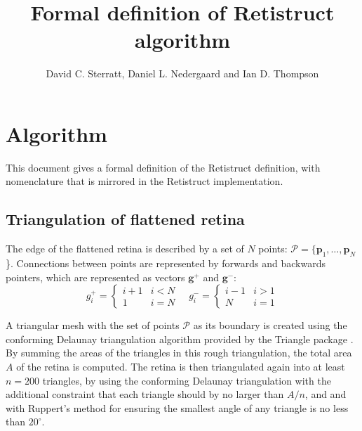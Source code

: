 \documentclass{article}
\title{Formal definition of Retistruct algorithm}
\author{David C. Sterratt, Daniel L. Nedergaard and Ian D. Thompson}
\renewcommand{\vec}[1]{\mathbf{#1}}
\begin{document}
\maketitle
\thispagestyle{myheadings}

\section{Algorithm}
\label{fold-retina:sec:method}

This document gives a formal definition of the Retistruct definition,
with nomenclature that is mirrored in the Retistruct implementation.

\subsection{Triangulation of flattened retina}
\label{fold-sphere:sec:triang-flatt-retina}


The edge of the flattened retina is described by a set of $N$ points:
$\mathcal{P} = \{\vec{p}_1,\dots,\vec{p}_N$\}. Connections between
points are represented by forwards and backwards pointers, which are
represented as vectors $\vec{g}^+$ and $\vec{g}^-$:
\begin{displaymath}
  g^+_i = \left\{
    \begin{array}{ll}
      i+1 & i < N \\
      1   & i = N
    \end{array}\right.
  \quad
  g^-_i = \left\{
    \begin{array}{ll}
      i-1 & i > 1 \\
      N   & i = 1
    \end{array}\right.
\end{displaymath}

A triangular mesh with the set of points $\mathcal{P}$ as its boundary
is created using the conforming Delaunay triangulation algorithm
provided by the Triangle package \citep{Shewchuk1996}. By summing the
areas of the triangles in this rough triangulation, the total area $A$
of the retina is computed. The retina is then triangulated again into
at least $n=200$ triangles, by using the conforming Delaunay
triangulation with the additional constraint that each triangle should
by no larger than $A/n$, and and with Ruppert's
 method for ensuring the smallest angle of
any triangle is no less than $20^\circ$.
\end{document}
